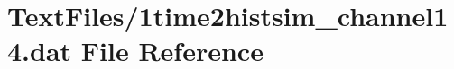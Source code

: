\hypertarget{1time2histsim__channel14_8dat}{}\section{Text\+Files/1time2histsim\+\_\+channel14.dat File Reference}
\label{1time2histsim__channel14_8dat}
